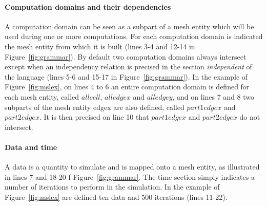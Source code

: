 \paragraph{Computation domains and their dependencies} A computation domain can be seen as a subpart of a mesh entity which will be used during one or more computations. For each computation domain is indicated the mesh entity from which it is built (lines 3-4 and 12-14 in Figure~\ref{fig:grammar}). By default two computation domains always intersect except when an independency relation is precised in the section \emph{independent} of the language (lines 5-6 and 15-17 in Figure~\ref{fig:grammar}). In the example of Figure~\ref{fig:mslex}, on lines 4 to 6 an entire computation domain is defined for each mesh entity, called $allcell$, $alledgex$ and $alledgey$, and on lines 7 and 8 two subparts of the mesh entity edgex are also defined, called $part1edgex$ and $part2edgex$. It is then precised on line 10 that $part1edgex$ and $part2edgex$ do not intersect.

\paragraph{Data and time} A data is a quantity to simulate and is mapped onto a mesh entity, as illustrated in lines 7 and 18-20 f Figure~\ref{fig:grammar}. The time section simply indicates a number of iterations to perform in the simulation. In the example of Figure~\ref{fig:mslex} are defined ten data and 500 iterations (lines 11-22).

